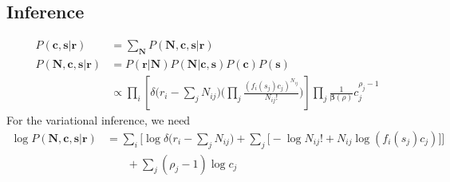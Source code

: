 \documentclass[12pt]{article}
\begin{document}
\subsection{Inference}
\begin{equation}
\begin{aligned}
P(\mathbf{c, s|r}) & = \sum_\mathbf{N} P(\mathbf{N, c, s|r}) \\
P(\mathbf{N, c, s|r}) 
& =  P(\mathbf{r|N}) P(\mathbf{N|c, s}) P(\mathbf{c}) P(\mathbf{s})\\
&\propto \prod_i \left[\delta \Big(r_i - \sum_j N_{ij} \Big) \bigg( \prod_j\frac{(f_i(s_j)c_j)^{N_{ij}}}{N_{ij}!} \bigg) \right] \prod_j \frac{1}{\mathbf{\beta}(\rho)} c_j^{\rho_j - 1} 
\end{aligned}
\end{equation}
For the variational inference, we need\\
 \begin{equation}
\begin{aligned}
\log P(\mathbf{N, c, s| r}) &= \sum_i \Big[ \log\delta \Big( r_i - \sum_j N_{ij} \Big) + \sum_j \big[-\log N_{ij}! + N_{ij} \log(f_i(s_j)c_j)\big] \Big]\\
& \phantom{{}=1} + \sum_j (\rho_j - 1)\log c_j
\end{aligned}
\end{equation}
\end{document}
